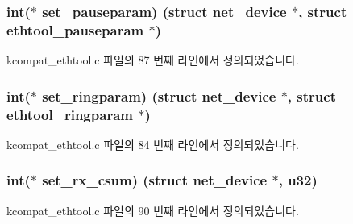 \subsubsection[{\texorpdfstring{set\+\_\+pauseparam}{set_pauseparam}}]{\setlength{\rightskip}{0pt plus 5cm}int($\ast$ set\+\_\+pauseparam) (struct net\+\_\+device $\ast$, struct {\bf ethtool\+\_\+pauseparam} $\ast$)}\hypertarget{struct__kc__ethtool__ops_a46fae36c29482f58ff935ad78ba6211d}{}\label{struct__kc__ethtool__ops_a46fae36c29482f58ff935ad78ba6211d}


kcompat\+\_\+ethtool.\+c 파일의 87 번째 라인에서 정의되었습니다.

\subsubsection[{\texorpdfstring{set\+\_\+ringparam}{set_ringparam}}]{\setlength{\rightskip}{0pt plus 5cm}int($\ast$ set\+\_\+ringparam) (struct net\+\_\+device $\ast$, struct {\bf ethtool\+\_\+ringparam} $\ast$)}\hypertarget{struct__kc__ethtool__ops_ab34c07fad2ade1808eb427bd3fddf1a8}{}\label{struct__kc__ethtool__ops_ab34c07fad2ade1808eb427bd3fddf1a8}


kcompat\+\_\+ethtool.\+c 파일의 84 번째 라인에서 정의되었습니다.

\subsubsection[{\texorpdfstring{set\+\_\+rx\+\_\+csum}{set_rx_csum}}]{\setlength{\rightskip}{0pt plus 5cm}int($\ast$ set\+\_\+rx\+\_\+csum) (struct net\+\_\+device $\ast$, {\bf u32})}\hypertarget{struct__kc__ethtool__ops_aca19dbed7f61812282c99df2a67d04d4}{}\label{struct__kc__ethtool__ops_aca19dbed7f61812282c99df2a67d04d4}


kcompat\+\_\+ethtool.\+c 파일의 90 번째 라인에서 정의되었습니다.

